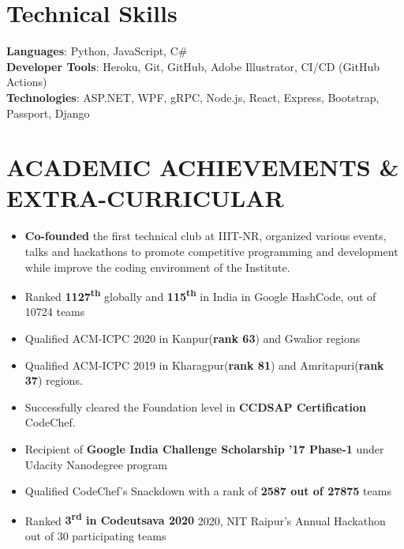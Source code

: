 \documentclass[letterpaper,11pt]{article}
\newcommand{\achievementItem}[1]{
  \item\small{
    {#1 \vspace{-6pt}}
  }
}
\newcommand{\resumeSubHeadingListEnd}{\end{itemize}}
\begin{document}
%
\section{Technical Skills}
 \begin{itemize}[leftmargin=0.15in, label={}]
    {\item{
     \textbf{Languages}{: Python, JavaScript, C\#} \\
     \vspace{1pt}
     \textbf{Developer Tools}{: Heroku, Git, GitHub, Adobe Illustrator, CI/CD (GitHub Actions) } \\
     \vspace{1pt}
     \textbf{Technologies}{: ASP.NET, WPF, gRPC, Node.js, React, Express, Bootstrap, Passport, Django} \\
    }}
 \end{itemize}
 \vspace{-16pt}



\section{ACADEMIC ACHIEVEMENTS \& EXTRA-CURRICULAR}

\begin{itemize}[leftmargin=0.2in]
  \achievementItem{\textbf{Co-founded}  the  first  technical  club  at  IIIT-NR,  organized  various  events, talks and hackathons to  promote competitive programming and development while improve the coding environment of the Institute.}
  \achievementItem{Ranked \textbf{1127\textsuperscript{th}} globally and \textbf{115\textsuperscript{th}} in India in Google HashCode, out of 10724 teams}
  \achievementItem{Qualified ACM-ICPC 2020 in Kanpur(\textbf{rank 63}) and Gwalior regions}
  \achievementItem{Qualified ACM-ICPC 2019 in Kharagpur(\textbf{rank 81}) and Amritapuri(\textbf{rank 37}) regions.}
  \achievementItem{Successfully cleared the Foundation level in \textbf{CCDSAP Certification} CodeChef.}
  \achievementItem{Recipient of {\bf Google India Challenge Scholarship '17 Phase-1} under Udacity Nanodegree program}
  \achievementItem{Qualified CodeChef’s Snackdown with a rank of \textbf{2587 out of 27875}  teams}
  \achievementItem{Ranked {\bf 3\textsuperscript{rd} in Codeutsava 2020} 2020, NIT Raipur’s Annual Hackathon out of 30 participating teams}
\end{itemize}
        
\end{document}
